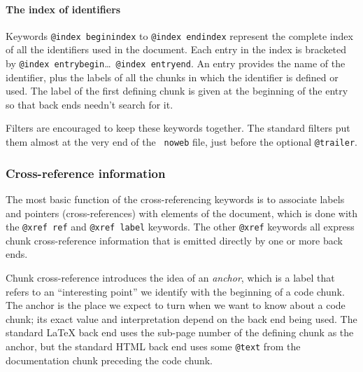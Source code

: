 \documentclass{article}
\makeatletter
\newcommand\kw[1]{\texttt{@#1}}
\newcommand\ikw[1]{\kw{index~#1}}
\newcommand\ikws[2]{\ikw{#1}\hbox{\thinspace}\ldots~\ikw{#2}}
\newcommand\xkw[1]{\kw{xref~#1}}
\makeatother
\begin{document}
\paragraph{The index of identifiers}

Keywords \ikw{beginindex} to \ikw{endindex} represent the
complete index of all the identifiers used in the document.
Each entry in the index is bracketed by \ikws{entrybegin}{entryend}.
An entry provides the name of the identifier, plus the labels of all the
chunks in which the identifier is defined or used.
The label of the first defining chunk
is given at the beginning of the entry so that back ends needn't
search for it.
{\hfuzz=4.9pt\par}

Filters are encouraged to keep these keywords together.
The standard filters put them almost at the very end of the {\tt
noweb} file, just before the optional \kw{trailer}.



\subsubsection{Cross-reference information}

\newcommand\anchor{{\rmfamily\textit{anchor}}}


The most basic function of the cross-referencing keywords is to
associate labels and pointers (cross-references) with elements of the
document, which is done with the \xkw{ref} and \xkw{label} keywords.
The other \kw{xref} keywords all express chunk cross-reference
information that is emitted directly by one or more back ends.

Chunk cross-reference introduces the idea of
an {\anchor}, which is a label that refers to an ``interesting point''
we identify with the
beginning of a code chunk.
The anchor is the place we expect to turn when we want to know about a
code chunk;
its exact value and interpretation depend on the back end being used.
The standard {\LaTeX} back end uses the sub-page number of the
defining chunk as the anchor, but the standard HTML back end uses some
\kw{text} from the documentation chunk preceding the code chunk.
\end{document}
